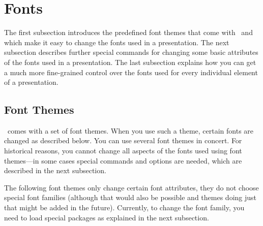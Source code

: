 %
%
%


\section{Fonts}

\label{section-fonts}

The first subsection introduces the predefined font
themes that come with \beamer\ and which make it easy to change the
fonts used in a presentation. The next subsection describes further
special commands for changing some basic attributes of the fonts used in a
presentation. The last subsection explains how you can get a much more
fine-grained control over the fonts used for every individual element
of a presentation.





\subsection{Font Themes}

\beamer\ comes with a set of font themes. When you use such a theme,
certain fonts are changed as described below. You can use several font
themes in concert. For historical reasons, you cannot change all
aspects of the fonts used using font themes---in some cases special
commands and options are needed, which are described in the next
subsection.

The following font themes only change certain font attributes, they do
not choose special font families (although that would also be possible
and themes doing just that might be added in the future). Currently,
to change the font family, you need to load special packages as
explained in the next subsection.


